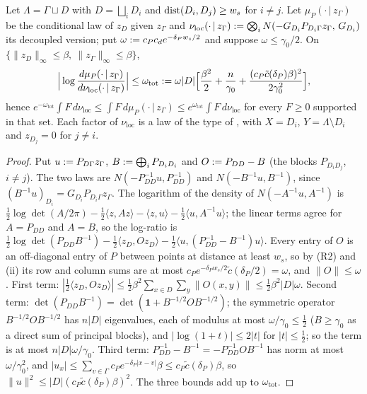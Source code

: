 \begin{lemma}\label{rot:lem:R1dec}
Let $\Lambda=\Gamma\sqcup D$ with $D=\bigsqcup_iD_i$ and $\operatorname{dist}(D_i,D_j)\ge w_s$ for $i\ne j$. Let $\mu_P(\cdot\,|\,z_\Gamma)$ be the conditional law of $z_D$ given $z_\Gamma$ and $\nu_{\mathrm{loc}}(\cdot\,|\,z_\Gamma):=\bigotimes_iN(-G_{D_i}P_{D_i\Gamma}z_\Gamma,\,G_{D_i})$ its decoupled version; put $\omega:= c_Pc_de^{-\delta_Pw_s/2}$ and suppose $\omega\le\gamma_0/2$. On $\{\|z_D\|_\infty\le\beta,\ \|z_\Gamma\|_\infty\le\beta\}$,
\[
\Big|\log\frac{d\mu_P(\cdot\,|\,z_\Gamma)}{d\nu_{\mathrm{loc}}(\cdot\,|\,z_\Gamma)}\Big|\le\omega_{\mathrm{tot}}:=\omega|D|\Big[\frac{\beta^2}2+\frac n{\gamma_0}+\frac{(c_P\tilde c(\delta_P)\beta)^2}{2\gamma_0^2}\Big],
\]
hence $e^{-\omega_{\mathrm{tot}}}\int F\,d\nu_{\mathrm{loc}}\le\int F\,d\mu_P(\cdot\,|\,z_\Gamma)\le e^{\omega_{\mathrm{tot}}}\int F\,d\nu_{\mathrm{loc}}$ for every $F\ge0$ supported in that set. Each factor of $\nu_{\mathrm{loc}}$ is a law of the type of , with $X=D_i$, $Y=\Lambda\setminus D_i$ and $z_{D_j}=0$ for $j\ne i$.
\end{lemma}
\begin{proof}
Put $u:= P_{D\Gamma}z_\Gamma$, $B:=\bigoplus_iP_{D_iD_i}$ and $O:= P_{DD}-B$ (the blocks $P_{D_iD_j}$, $i\ne j$). The two laws are $N(-P_{DD}^{-1}u,P_{DD}^{-1})$ and $N(-B^{-1}u,B^{-1})$, since $(B^{-1}u)_{D_i}=G_{D_i}P_{D_i\Gamma}z_\Gamma$. The logarithm of the density of $N(-A^{-1}u,A^{-1})$ is $\frac12\log\det(A/2\pi)-\frac12\langle z,Az\rangle-\langle z,u\rangle-\frac12\langle u,A^{-1}u\rangle$; the linear terms agree for $A=P_{DD}$ and $A=B$, so the log-ratio is $\frac12\log\det(P_{DD}B^{-1})-\frac12\langle z_D,Oz_D\rangle-\frac12\langle u,(P_{DD}^{-1}-B^{-1})u\rangle$. Every entry of $O$ is an off-diagonal entry of $P$ between points at distance at least $w_s$, so by (R2) and (ii) its row and column sums are at most $c_Pe^{-\delta_Pw_s/2}\tilde c(\delta_P/2)=\omega$, and $\|O\|\le\omega$. First term: $|\frac12\langle z_D,Oz_D\rangle|\le\frac12\beta^2\sum_{x\in D}\sum_y\|O(x,y)\|\le\frac12\beta^2|D|\omega$. Second term: $\det(P_{DD}B^{-1})=\det(\mathbf 1+B^{-1/2}OB^{-1/2})$; the symmetric operator $B^{-1/2}OB^{-1/2}$ has $n|D|$ eigenvalues, each of modulus at most $\omega/\gamma_0\le\frac12$ ($B\ge\gamma_0$ as a direct sum of principal blocks), and $|\log(1+t)|\le2|t|$ for $|t|\le\frac12$; so the term is at most $n|D|\omega/\gamma_0$. Third term: $P_{DD}^{-1}-B^{-1}=-P_{DD}^{-1}OB^{-1}$ has norm at most $\omega/\gamma_0^2$, and $|u_x|\le\sum_{v\in\Gamma}c_Pe^{-\delta_P|x-v|}\beta\le c_P\tilde c(\delta_P)\beta$, so $\|u\|^2\le|D|(c_P\tilde c(\delta_P)\beta)^2$. The three bounds add up to $\omega_{\mathrm{tot}}$.
\end{proof}
